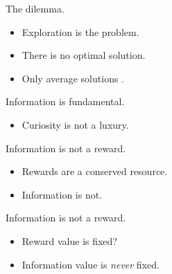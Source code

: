 \documentclass[10pt]{beamer}
\begin{document}
\begin{frame}[fragile]{The dilemma.}
\begin{itemize}
    \item Exploration is the problem.
    \item There is no optimal solution.
    \item Only average solutions \cite{Thrun1992a,Dayan1996,Findling2018,Gershman2018b}.
\end{itemize}
\end{frame}

\begin{frame}[fragile]{Information is fundamental.}
\begin{itemize}
    \item Curiosity is not a luxury.
\end{itemize}
\end{frame}

\begin{frame}[fragile]{Information is not a reward.}
\begin{itemize}
    \item Rewards are a conserved resource.
    \item Information is not.
\end{itemize}
\end{frame}

\begin{frame}[fragile]{Information is not a reward.}
\begin{itemize}
    \item Reward value is fixed?
    \item Information value is \textit{never} fixed.
\end{itemize}
\end{frame}


%   
%   

\end{document}
